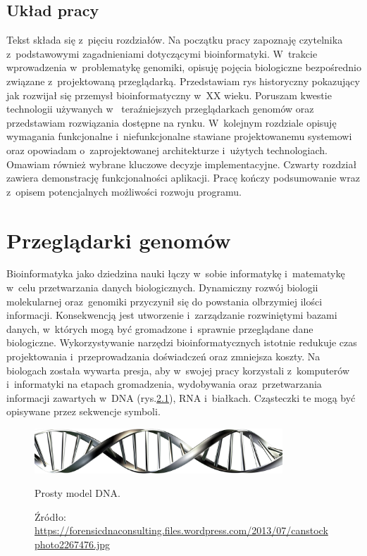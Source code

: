 \documentclass[a4paper,12pt,oneside]{mwrep}  %
\begin{document}
\section{Układ pracy}
Tekst składa się z~pięciu rozdziałów. Na początku pracy zapoznaję czytelnika z~podstawowymi zagadnieniami dotyczącymi bioinformatyki. W~trakcie wprowadzenia w~problematykę genomiki, opisuję pojęcia biologiczne bezpośrednio związane z~projektowaną przeglądarką. Przedstawiam rys historyczny pokazujący jak rozwijał się przemysł bioinformatyczny w~XX wieku. Poruszam kwestie technologii używanych w~ teraźniejszych przeglądarkach genomów oraz przedstawiam rozwiązania dostępne na rynku. W~kolejnym rozdziale opisuję wymagania funkcjonalne i~niefunkcjonalne stawiane projektowanemu systemowi oraz opowiadam o~zaprojektowanej architekturze i~użytych technologiach. Omawiam również wybrane kluczowe decyzje implementacyjne. Czwarty rozdział zawiera demonstrację funkcjonalności aplikacji. Pracę kończy podsumowanie wraz z~opisem potencjalnych możliwości rozwoju programu.

\chapter{Przeglądarki genomów}

Bioinformatyka jako dziedzina nauki łączy w~sobie informatykę i~matematykę w~celu przetwarzania danych biologicznych. Dynamiczny rozwój biologii molekularnej oraz~genomiki przyczynił się do powstania olbrzymiej ilości informacji. Konsekwencją jest utworzenie i~zarządzanie rozwiniętymi bazami danych, w~których mogą być gromadzone i~sprawnie przeglądane dane biologiczne. Wykorzystywanie narzędzi bioinformatycznych istotnie redukuje czas projektowania i~przeprowadzania doświadczeń oraz zmniejsza koszty. Na biologach została wywarta presja, aby w~swojej pracy korzystali z~komputerów i~informatyki na etapach gromadzenia, wydobywania oraz~przetwarzania informacji zawartych w~DNA (rys.\ref{model-dna}), RNA i~białkach. Cząsteczki te mogą być opisywane przez sekwencje symboli. %

\begin{figure}[!h]
\centering
\includegraphics[width=0.83\textwidth]{grafika/DNA2}
\caption{Prosty model DNA.}
\vspace{-0.8cm}
\caption*{\scriptsize Źródło: \url{https://forensicdnaconsulting.files.wordpress.com/2013/07/canstockphoto2267476.jpg}}
\label{model-dna}
\end{figure}
\end{document}
